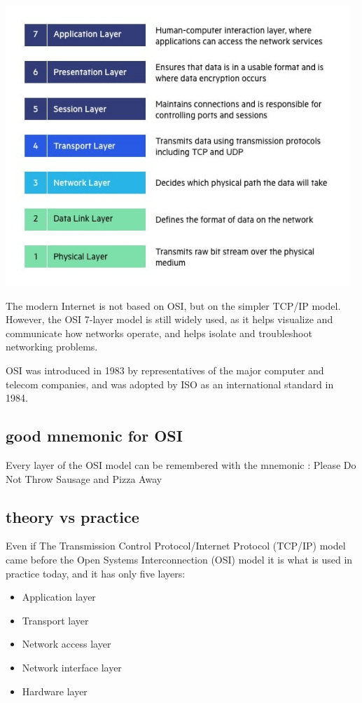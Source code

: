 \documentclass[a4paper,12pt]{article}
\begin{document}
\includegraphics[width=13cm]{./OSI-7-layers.jpg}

The modern Internet is not based on OSI, but on the simpler TCP/IP model. However, the OSI 7-layer model is still widely used, as it helps visualize and communicate how networks operate, and helps isolate and troubleshoot networking problems.

OSI was introduced in 1983 by representatives of the major computer and telecom companies, and was adopted by ISO as an international standard in 1984.

\subsection{good mnemonic for OSI}
Every layer of the OSI model can be remembered with the mnemonic : Please Do Not Throw Sausage and Pizza Away

\subsection{theory vs practice}
Even if The Transmission Control Protocol/Internet Protocol (TCP/IP) model came before the Open Systems Interconnection (OSI) model it is what is used in practice today, and it has only five layers:

\begin{itemize}
\item {Application layer}
\item {Transport layer}
\item {Network access layer}
\item {Network interface layer}
\item {Hardware layer}
\end{itemize}
\end{document}
